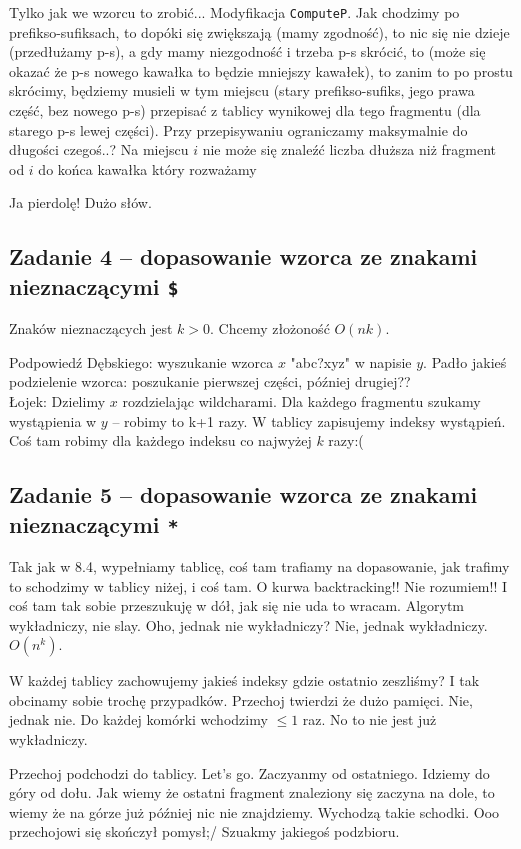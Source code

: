 Tylko jak we wzorcu to zrobić... Modyfikacja \texttt{ComputeP}. Jak chodzimy po prefikso-sufiksach, to dopóki się zwiększają (mamy zgodność), to nic się nie dzieje (przedłużamy p-s), a gdy mamy niezgodność i trzeba p-s skrócić, to (może się okazać że p-s nowego kawałka to będzie mniejszy kawałek), to zanim to po prostu skrócimy, będziemy musieli w tym miejscu (stary prefikso-sufiks, jego prawa część, bez nowego p-s) przepisać z tablicy wynikowej dla tego fragmentu (dla starego p-s lewej części). Przy przepisywaniu ograniczamy maksymalnie do długości czegoś..? Na miejscu $i$ nie może się znaleźć liczba dłuższa niż fragment od $i$ do końca kawałka który rozważamy

Ja pierdolę! Dużo słów.



\subsection{Zadanie 4 -- dopasowanie wzorca ze znakami nieznaczącymi \texttt{\$}}
Znaków nieznaczących jest $k>0$. Chcemy złożoność $O(nk)$.

Podpowiedź Dębskiego: wyszukanie wzorca $x$ "abc?xyz" w napisie $y$. Padło jakieś podzielenie wzorca: poszukanie pierwszej części, później drugiej?? \\
Łojek: Dzielimy $x$ rozdzielając wildcharami. Dla każdego fragmentu szukamy wystąpienia w $y$ -- robimy to k+1 razy. W tablicy zapisujemy indeksy wystąpień. Coś tam robimy dla każdego indeksu co najwyżej $k$ razy:(

\subsection{Zadanie 5 -- dopasowanie wzorca ze znakami nieznaczącymi \texttt{*}}
Tak jak w 8.4, wypełniamy tablicę, coś tam trafiamy na dopasowanie, jak trafimy to schodzimy w tablicy niżej, i  coś tam. O kurwa backtracking!! Nie rozumiem!! I coś tam tak sobie przeszukuję w dół, jak się nie uda to wracam. Algorytm wykładniczy, nie slay. Oho, jednak nie wykładniczy? Nie, jednak wykładniczy. $O(n^k)$.

W każdej tablicy zachowujemy jakieś indeksy gdzie ostatnio zeszliśmy? I tak obcinamy sobie trochę przypadków. Przechoj twierdzi że dużo pamięci. Nie, jednak nie. Do każdej komórki wchodzimy $\leq 1$ raz. No to nie jest już wykładniczy.

Przechoj podchodzi do tablicy. Let's go. Zaczyanmy od ostatniego. Idziemy do góry od dołu. Jak wiemy że ostatni fragment znaleziony się zaczyna na dole, to wiemy że na górze już później nic nie znajdziemy. Wychodzą takie schodki.
Ooo przechojowi się skończył pomysł;/ Szuakmy jakiegoś podzbioru.

